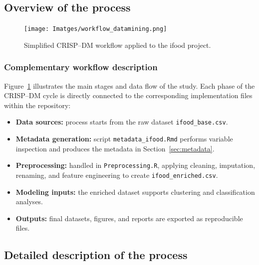 \subsection{Overview of the process}

\begin{figure}[H]
    \centering
    \texttt{[image: Imatges/workflow\_datamining.png]}
    \caption{Simplified CRISP--DM workflow applied to the ifood project.}
    \label{fig:workflow_dm}
\end{figure}

\subsubsection*{Complementary workflow description}

Figure~\ref{fig:workflow_dm} illustrates the main stages and data flow of the study.  
Each phase of the CRISP--DM cycle is directly connected to the corresponding implementation files within the repository:

\begin{itemize}[leftmargin=1.2cm]
    \item \textbf{Data sources:} process starts from the raw dataset \texttt{ifood\_base.csv}.
    \item \textbf{Metadata generation:} script \texttt{metadata\_ifood.Rmd} performs variable inspection and produces the metadata in Section~\ref{sec:metadata}.
    \item \textbf{Preprocessing:} handled in \texttt{Preprocessing.R}, applying cleaning, imputation, renaming, and feature engineering to create \texttt{ifood\_enriched.csv}.
    \item \textbf{Modeling inputs:} the enriched dataset supports clustering and classification analyses.
    \item \textbf{Outputs:} final datasets, figures, and reports are exported as reproducible files.
\end{itemize}

\subsection{Detailed description of the process}

